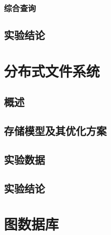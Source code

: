 \documentclass{ctexrep}
\begin{document}
	\subsubsection{综合查询}
	\subsection{实验结论}
	
	
	\section{分布式文件系统}
	\subsection{概述}
	\subsection{存储模型及其优化方案}
	\subsection{实验数据}
	\subsection{实验结论}
	
	\section{图数据库}
\end{document}
